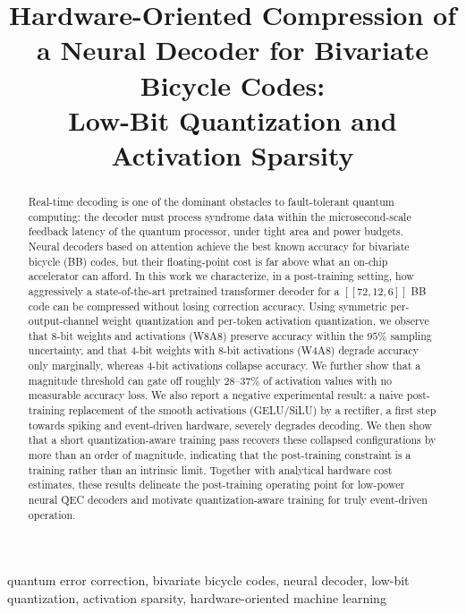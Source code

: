 ﻿\documentclass[conference]{IEEEtran}
\begin{document}
\title{Hardware-Oriented Compression of a Neural Decoder for Bivariate
Bicycle Codes:\\
Low-Bit Quantization and Activation Sparsity}
\author{
}
\maketitle
\begin{abstract}
Real-time decoding is one of the dominant obstacles to fault-tolerant
quantum computing: the decoder must process syndrome data within the
microsecond-scale feedback latency of the quantum processor, under tight
area and power budgets. Neural decoders based on attention achieve the
best known accuracy for bivariate bicycle (BB) codes, but their
floating-point cost is far above what an on-chip accelerator can afford.
In this work we characterize, in a post-training setting, how
aggressively a state-of-the-art pretrained transformer decoder for a
$[[72,12,6]]$ BB code can be compressed without losing correction
accuracy. Using symmetric per-output-channel weight quantization and
per-token activation quantization, we observe that 8-bit weights and
activations (W8A8) preserve accuracy within the $95\%$ sampling
uncertainty, and that 4-bit weights with 8-bit activations (W4A8) degrade
accuracy only marginally, whereas 4-bit activations collapse accuracy. We
further show that a magnitude threshold can gate off roughly $28$--$37\%$
of activation values with no measurable accuracy loss. We also report a
negative experimental result: a naive post-training replacement of the
smooth activations (GELU/SiLU) by a rectifier, a first step towards
spiking and event-driven hardware, severely degrades decoding. We then
show that a short quantization-aware training pass recovers these
collapsed configurations by more than an order of magnitude, indicating
that the post-training constraint is a training rather than an intrinsic
limit. Together with analytical hardware cost estimates, these results
delineate the post-training operating point for low-power neural QEC
decoders and motivate quantization-aware training for truly event-driven
operation.
\end{abstract}
\begin{IEEEkeywords}
quantum error correction, bivariate bicycle codes, neural decoder,
low-bit quantization, activation sparsity, hardware-oriented machine
learning
\end{IEEEkeywords}
\end{document}
